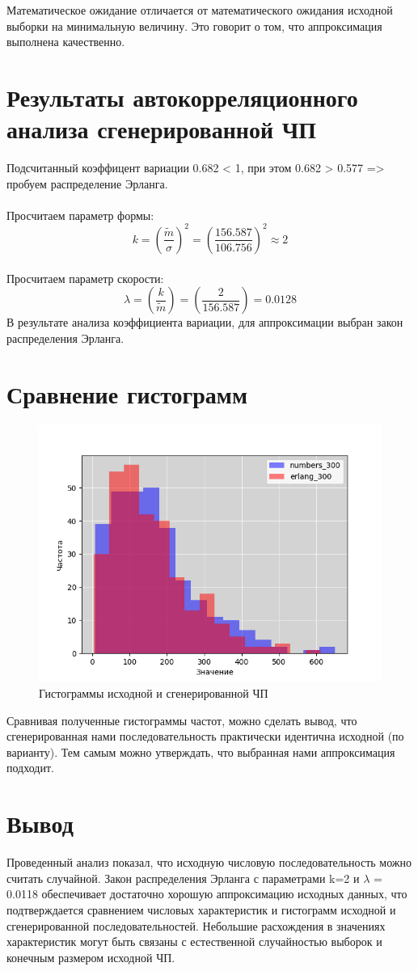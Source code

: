 \documentclass{article}
\begin{document}
Математическое ожидание отличается от математического ожидания исходной
    выборки на минимальную величину. Это говорит
    о том, что аппроксимация выполнена качественно.

\section{Результаты автокорреляционного анализа сгенерированной ЧП}

Подсчитанный коэффицент вариации 0.682 < 1, при этом 0.682 > 0.577 => пробуем распределение Эрланга.
\\\\
Просчитаем параметр формы:
\[k = \left(\frac{\widetilde{m}}{\sigma}\right)^2 = \left(\frac{156.587}{106.756}\right)^2 \approx 2 \]
\\
Просчитаем параметр скорости:
\[\lambda = \left(\frac{k}{\widetilde{m}}\right) = \left(\frac{2}{156.587}\right) = 0.0128 \]
В результате анализа коэффициента вариации, для аппроксимации выбран закон распределения Эрланга.

\section{Сравнение гистограмм}
\begin{figure}[H]
    \centering
    \includegraphics[width=.6\textwidth]{3}
    \caption{Гистограммы исходной и сгенерированной ЧП}
\end{figure}
Сравнивая полученные гистограммы частот, можно сделать вывод, что
сгенерированная нами последовательность практически идентична исходной (по
варианту). Тем самым можно утверждать, что выбранная нами аппроксимация
подходит.

\section*{Вывод}
Проведенный анализ показал, что исходную числовую последовательность можно считать случайной. 
Закон распределения Эрланга с параметрами k=2 и $\lambda$ = 0.0118 обеспечивает достаточно хорошую аппроксимацию исходных данных, 
что подтверждается сравнением числовых характеристик и гистограмм исходной и сгенерированной последовательностей. 
Небольшие расхождения в значениях характеристик могут быть связаны с естественной случайностью выборок и конечным размером исходной ЧП.
\end{document}
